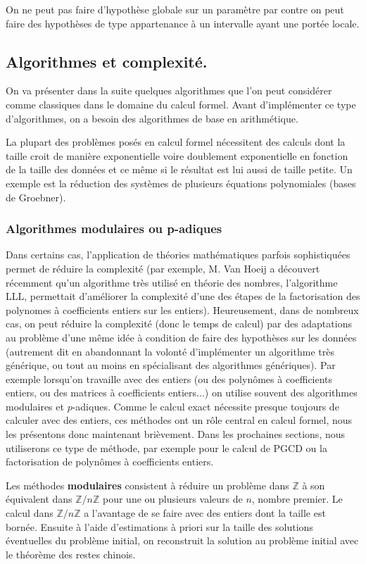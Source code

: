 \documentclass[a4paper,11pt]{article}
\begin{document}
\begin{giacjshere}
On ne peut pas faire d'hypothèse globale sur un paramètre par
contre on peut faire des hypothèses de type appartenance à un intervalle 
ayant une portée locale.

\subsection{Algorithmes et complexité.}
On va présenter dans la suite quelques algorithmes que l'on peut
considérer comme classiques dans le domaine du calcul formel. Avant 
d'implémenter ce type d'algorithmes, on a besoin des algorithmes de base
en arithmétique. 

La plupart des problèmes posés en calcul formel nécessitent des
calculs dont la taille croit de manière exponentielle voire
doublement exponentielle en fonction de la taille des données et
ce même si le résultat est lui aussi de taille petite. Un
exemple est la réduction des systèmes de plusieurs équations polynomiales
(bases de Groebner).

\subsubsection{Algorithmes modulaires ou p-adiques}
Dans certains cas, l'application de théories mathématiques
parfois sophistiquées permet de réduire la complexité (par exemple,
M. Van Hoeij a découvert récemment qu'un algorithme très utilisé en théorie des
nombres, l'algorithme LLL, permettait d'améliorer la complexité d'une des
étapes de la factorisation des polynomes à coefficients entiers sur les
entiers). Heureusement, dans de nombreux cas, on peut r\'eduire la
complexit\'e (donc le temps de calcul) par des adaptations au
probl\`eme d'une m\^eme id\'ee \`a condition de faire des
hypoth\`eses sur les donn\'ees (autrement dit en abandonnant la volont\'e
d'impl\'ementer un algorithme tr\`es g\'en\'erique, ou tout au moins
en sp\'ecialisant des algorithmes g\'en\'eriques).
 Par exemple lorsqu'on travaille
avec des entiers (ou des polyn\^omes \`a coefficients entiers, ou
des matrices \`a coefficients entiers...) on utilise souvent des algorithmes
modulaires et $p$-adiques. Comme le calcul exact n\'ecessite
presque toujours de calculer avec des entiers, ces m\'ethodes
ont un r\^ole central en calcul formel, nous les pr\'esentons donc
maintenant bri\`evement. Dans les prochaines sections, nous utiliserons
ce type de m\'ethode, par exemple pour le calcul de PGCD ou la factorisation
de polyn\^omes \`a coefficients entiers.

Les m\'ethodes {\bf modulaires} consistent \`a r\'eduire un probl\`eme dans 
$\mathbb{Z}$ \`a son \'equivalent dans $\mathbb{Z}/n\mathbb{Z}$ pour une ou 
plusieurs valeurs de $n$, nombre premier. Le calcul dans $\mathbb{Z}/n\mathbb{Z}$
a l'avantage de se faire avec des entiers dont la taille est bornée.
Ensuite \`a l'aide d'estimations 
\`a priori sur la taille des solutions 
\'eventuelles du probl\`eme initial, on reconstruit la solution au problème
initial avec le th\'eor\`eme des restes chinois. 


\end{giacjshere}
\end{document}
